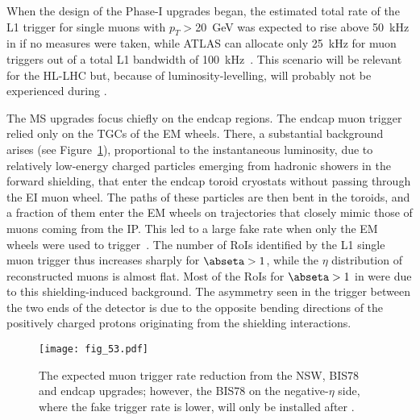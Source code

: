 \documentclass[cernpreprint, atlasdraft=false, UKenglish,british,orcidlogo, texmf, orcidlogo]{atlasdoc}
\begin{document}
When the design of the Phase-I upgrades began, the estimated total rate of the \gls{L1} trigger for single muons with $p_T >$\SI{20}{\GeV} was expected to rise above \SI{50}{\kHz} in \RunThr
if no measures were taken, while ATLAS can allocate only \SI{25}{\kHz}
for muon triggers out of a total \gls{L1} bandwidth of \SI{100}{\kHz}~\cite{ATLAS-TDR-23}.
This scenario will be relevant for the \gls{HL-LHC} but, because of luminosity-levelling, will probably not be experienced during \RunThr.
 
 
The \gls{MS} upgrades focus chiefly on the endcap regions.
The \RunOne endcap muon trigger relied only on the \glspl{TGC} of the EM wheels.
There, a substantial background arises (see Figure~\ref{fig:TDAQL1MuonEndcapPerformance}), proportional to the instantaneous luminosity, due to relatively low-energy charged particles emerging
from hadronic showers in the forward shielding, that enter the endcap toroid cryostats without passing through the EI muon wheel. The paths of these particles are then bent in the toroids, and a fraction of them enter the EM wheels on trajectories that closely mimic those of muons coming from the \gls{IP}. This led to a large fake rate when only the EM wheels were used to trigger~\cite{ATLAS-TDR-20}.
The number of \glspl{RoI} identified by the \gls{L1} single muon trigger thus increases sharply for $\abseta > 1$, while the $\eta$ distribution of reconstructed muons is almost flat. Most of the \glspl{RoI} for $\abseta > 1$ in \RunOne were due to this shielding-induced background.
The asymmetry seen in the trigger between the two ends of the detector is due to the opposite bending directions of the positively charged protons originating from the shielding interactions.
\begin{figure}[htbp!]
\centerline{\texttt{[image: fig\_53.pdf]}}
\caption{The expected muon trigger rate reduction from the \gls{NSW}, \gls{BIS78} and  endcap upgrades; however, the \gls{BIS78} on the negative-$\eta$ side, where the fake trigger rate is lower, will only be installed after \RunThr.
}
\label{fig:TDAQL1MuonEndcapPerformance}
\end{figure}
 
\end{document}
